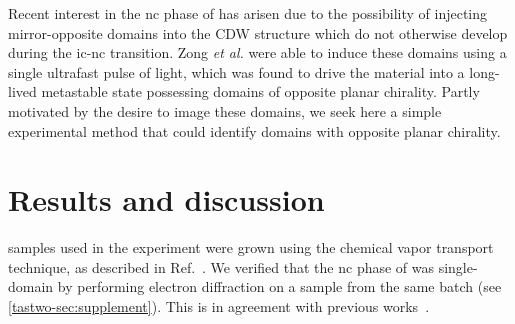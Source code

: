 Recent interest in the \gls{nc} phase of \tastwo has arisen due to the possibility of injecting mirror-opposite domains into the CDW structure \citep{zong_ultrafast_2018} which do not otherwise develop during the \gls{ic}-\gls{nc} transition.
Zong \textit{et al.} were able to induce these domains using a single ultrafast pulse of light, which was found to drive the material into a long-lived metastable state possessing domains of opposite planar chirality.
Partly motivated by the desire to image these domains, we seek here a simple experimental method that could identify domains with opposite planar chirality.

\section{Results and discussion}

\tastwo samples used in the experiment were grown using the chemical vapor transport technique, as described in Ref.~\citep{zong_ultrafast_2018}.
We verified that the \gls{nc} phase of \tastwo was single-domain by performing electron diffraction on a sample from the same batch (see \cref{tastwo-sec:supplement}).
This is in agreement with previous works~\citep{zong_ultrafast_2018, wilson_charge-density_1975, bovet_pseudogapped_2004, shiba_phenomenological_1986}.

